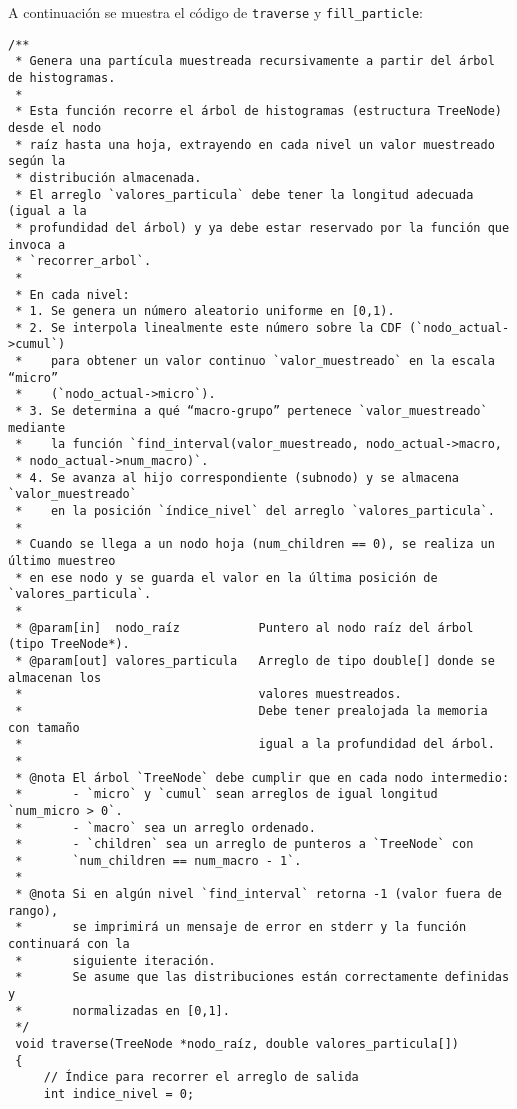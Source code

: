 A continuación se muestra el código de \texttt{traverse} y \texttt{fill\_particle}:

\begin{verbatim}
/**
 * Genera una partícula muestreada recursivamente a partir del árbol de histogramas.
 *
 * Esta función recorre el árbol de histogramas (estructura TreeNode) desde el nodo
 * raíz hasta una hoja, extrayendo en cada nivel un valor muestreado según la 
 * distribución almacenada.
 * El arreglo `valores_particula` debe tener la longitud adecuada (igual a la 
 * profundidad del árbol) y ya debe estar reservado por la función que invoca a 
 * `recorrer_arbol`.
 *
 * En cada nivel:
 * 1. Se genera un número aleatorio uniforme en [0,1).
 * 2. Se interpola linealmente este número sobre la CDF (`nodo_actual->cumul`)
 *    para obtener un valor continuo `valor_muestreado` en la escala “micro”
 *    (`nodo_actual->micro`).
 * 3. Se determina a qué “macro-grupo” pertenece `valor_muestreado` mediante
 *    la función `find_interval(valor_muestreado, nodo_actual->macro, 
 * nodo_actual->num_macro)`.
 * 4. Se avanza al hijo correspondiente (subnodo) y se almacena `valor_muestreado`
 *    en la posición `índice_nivel` del arreglo `valores_particula`.
 *
 * Cuando se llega a un nodo hoja (num_children == 0), se realiza un último muestreo
 * en ese nodo y se guarda el valor en la última posición de `valores_particula`.
 *
 * @param[in]  nodo_raíz           Puntero al nodo raíz del árbol (tipo TreeNode*).
 * @param[out] valores_particula   Arreglo de tipo double[] donde se almacenan los 
 *                                 valores muestreados.     
 *                                 Debe tener prealojada la memoria con tamaño 
 *                                 igual a la profundidad del árbol.
 *
 * @nota El árbol `TreeNode` debe cumplir que en cada nodo intermedio:
 *       - `micro` y `cumul` sean arreglos de igual longitud `num_micro > 0`.
 *       - `macro` sea un arreglo ordenado.
 *       - `children` sea un arreglo de punteros a `TreeNode` con 
 *       `num_children == num_macro - 1`.
 *
 * @nota Si en algún nivel `find_interval` retorna -1 (valor fuera de rango),
 *       se imprimirá un mensaje de error en stderr y la función continuará con la 
 *       siguiente iteración.
 *       Se asume que las distribuciones están correctamente definidas y 
 *       normalizadas en [0,1].
 */
 void traverse(TreeNode *nodo_raíz, double valores_particula[])
 {
     // Índice para recorrer el arreglo de salida
     int indice_nivel = 0;
 

\end{verbatim}
